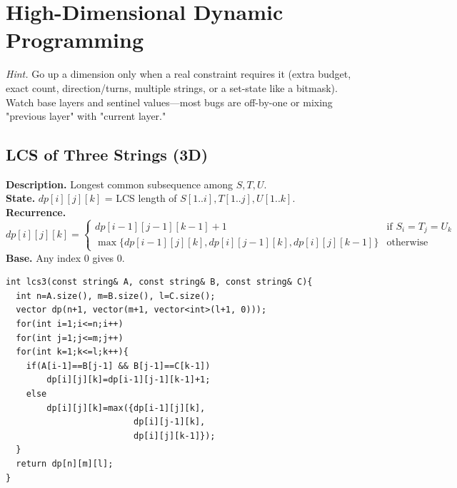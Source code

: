 \documentclass[9pt]{extarticle}
\begin{document}
\section{High-Dimensional Dynamic Programming}
\textit{Hint.} Go up a dimension only when a real constraint requires it (extra budget, exact count, direction/turns, multiple strings, or a set-state like a bitmask). Watch base layers and sentinel values—most bugs are off-by-one or mixing "previous layer" with "current layer."

\subsection{LCS of Three Strings (3D)}
\textbf{Description.} Longest common subsequence among \(S,T,U\).  \\
\textbf{State.} \(dp[i][j][k]\) = LCS length of \(S[1..i],T[1..j],U[1..k]\).  \\
\textbf{Recurrence.}
\[
dp[i][j][k]=\begin{cases}
dp[i-1][j-1][k-1]+1 & \text{if } S_i=T_j=U_k\\
\max\{dp[i-1][j][k],dp[i][j-1][k],dp[i][j][k-1]\} & \text{otherwise}
\end{cases}
\]
\textbf{Base.} Any index 0 gives 0.  
\begin{verbatim}
int lcs3(const string& A, const string& B, const string& C){
  int n=A.size(), m=B.size(), l=C.size();
  vector dp(n+1, vector(m+1, vector<int>(l+1, 0)));
  for(int i=1;i<=n;i++) 
  for(int j=1;j<=m;j++) 
  for(int k=1;k<=l;k++){
    if(A[i-1]==B[j-1] && B[j-1]==C[k-1]) 
        dp[i][j][k]=dp[i-1][j-1][k-1]+1;
    else 
        dp[i][j][k]=max({dp[i-1][j][k], 
                         dp[i][j-1][k], 
                         dp[i][j][k-1]});
  }
  return dp[n][m][l];
}
\end{verbatim}

\end{document}
